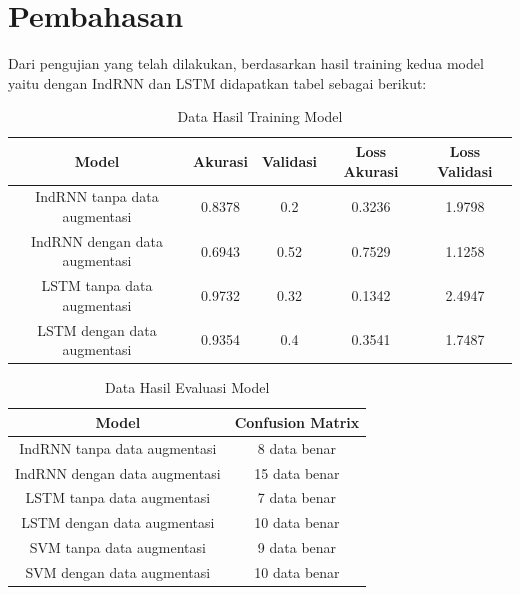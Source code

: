 \section{Pembahasan}
\label{sec:analisispengujian}

Dari pengujian yang telah dilakukan, berdasarkan hasil training kedua model
yaitu dengan IndRNN dan LSTM didapatkan tabel sebagai berikut:

\begin{longtable}{|c|c|c|c|c|}
  \caption{Data Hasil Training Model}
  \label{tb:EnergiKecepatan1}                                                                                           \\
  \hline
  \rowcolor[HTML]{C0C0C0}
  \textbf{Model}                & \textbf{Akurasi} & \textbf{Validasi} & \textbf{Loss Akurasi} & \textbf{Loss Validasi} \\
  \hline
  IndRNN tanpa data augmentasi  & 0.8378           & 0.2               & 0.3236                & 1.9798                 \\
  IndRNN dengan data augmentasi & 0.6943           & 0.52              & 0.7529                & 1.1258                 \\
  LSTM tanpa data augmentasi    & 0.9732           & 0.32              & 0.1342                & 2.4947                 \\
  LSTM dengan data augmentasi   & 0.9354           & 0.4               & 0.3541                & 1.7487                 \\
  \hline
\end{longtable}

\newpage
\begin{longtable}{|c|c|}
  \caption{Data Hasil Evaluasi Model}
  \label{tb:EnergiKecepatan}                                \\
  \hline
  \rowcolor[HTML]{C0C0C0}
  \textbf{Model}                & \textbf{Confusion Matrix} \\
  \hline
  IndRNN tanpa data augmentasi  & 8 data benar              \\
  IndRNN dengan data augmentasi & 15 data benar             \\
  LSTM tanpa data augmentasi    & 7 data benar              \\
  LSTM dengan data augmentasi   & 10 data benar             \\
  SVM tanpa data augmentasi     & 9 data benar              \\
  SVM dengan data augmentasi    & 10 data benar             \\
  \hline
\end{longtable}

